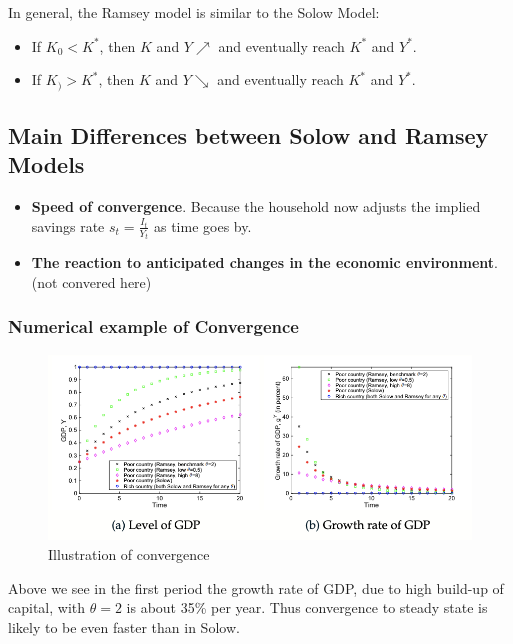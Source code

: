 \documentclass[11pt]{article}
\begin{document}
In general, the Ramsey model is similar to the Solow Model:
\begin{itemize}
    \item If $K_0 < K^*$, then $K$ and $Y \nearrow$ and eventually reach $K^*$ and $Y^*$.
    \item If $K_) > K^*$, then $K$ and $Y \searrow$ and eventually reach $K^*$ and $Y^*$.
\end{itemize}
\begin{shaded}
    \subsection*{Main Differences between Solow and Ramsey Models}

    \begin{itemize}
        \item \textbf{Speed of convergence}. Because the household now adjusts the implied savings rate $s_t = \frac{I_t}{Y_t}$ as time goes by.

        \item \textbf{The reaction to anticipated changes in the economic environment}. (not convered here)
    \end{itemize}
\end{shaded}

\newpage

\subsubsection{Numerical example of Convergence}

\begin{figure}[h]
    \centering
    \includegraphics[width=15cm]{photos/example of convergence.png}
    \caption{Illustration of convergence}
    \label{fig:convergence}
\end{figure}

Above we see in the first period the growth rate of GDP, due to high build-up of capital, with $\theta=2$ is about 35\% per year. Thus convergence to steady state is likely to be even faster than in Solow.
\end{document}

